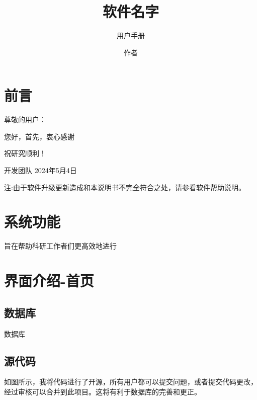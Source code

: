 \documentclass[]{ldrbook}
\begin{document}
%
%


\title{软件名字}
\subtitle{用户手册}
\author{作者}

\maketitle

\frontmatter


\customcontent


\mainmatter

\chapter{前言}

尊敬的用户：

您好，首先，衷心感谢


祝研究顺利！

开发团队
2024年5月4日


注:由于软件升级更新造成和本说明书不完全符合之处，请参看软件帮助说明。



\chapter{系统功能}

旨在帮助科研工作者们更高效地进行




\chapter{界面介绍-首页}


\section{数据库}

数据库

\section{源代码}

如图所示，我将代码进行了开源，所有用户都可以提交问题，或者提交代码更改，经过审核可以合并到此项目。这将有利于数据库的完善和更正。


\printbib
\end{document}
